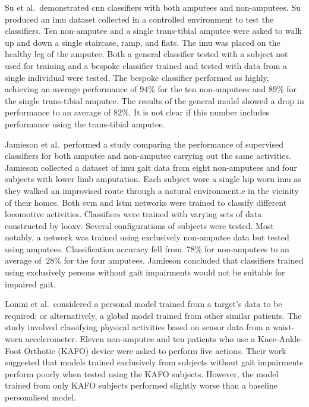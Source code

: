 Su et al.~demonstrated \acrshort{cnn} classifiers with both amputees and non-amputees. Su produced an \acrshort{imu} dataset collected in a controlled environment to test the classifiers. Ten non-amputee and a single trans-tibial amputee were asked to walk up and down a single staircase, ramp, and flats. The \acrshort{imu} was placed on the healthy leg of the amputee. Both a general classifier tested with a subject not used for training and a bespoke classifier trained and tested with data from a single individual were tested. The bespoke classifier performed as highly, achieving an average performance of $94\%$ for the ten non-amputees and $89\%$ for the single trans-tibial amputee. The results of the general model showed a drop in performance to an average of $82\%$. It is not clear if this number includes performance using the trans-tibial amputee.\cite{Su2019}

Jamieson et al.~performed a study comparing the performance of supervised classifiers for both amputee and non-amputee carrying out the same activities. Jamieson collected a dataset of \acrshort{imu} gait data from eight non-amputees and four subjects with lower limb amputation. Each subject wore a single hip worn \acrshort{imu} as they walked an improvised route through a natural environment.e in the vicinity of their homes.  Both \acrfull{svm} and \acrshort{lstm} networks were trained to classify different locomotive activities. Classifiers were trained with varying sets of data constructed by \acrfull{looxv}. Several configurations of subjects were tested. Most notably, a network was trained using exclusively non-amputee data but tested using amputees. Classification accuracy fell from $~78\%$ for non-amputees to an average of $~28\%$ for the four amputees. Jamieson concluded that classifiers trained using exclusively persons without gait impairments would not be suitable for impaired gait.\cite{Jamieson2021}

Lonini et al.~considered a personal model trained from a target's data to be required; or alternatively, a global model trained from other similar patients. The study involved classifying physical activities based on sensor data from a waist-worn accelerometer. Eleven non-amputee and ten patients who use a Knee-Ankle-Foot Orthotic (KAFO) device were asked to perform five actions. Their work suggested that models trained exclusively from subjects without gait impairments perform poorly when tested using the KAFO subjects. However, the model trained from only KAFO subjects performed slightly worse than a baseline personalised model.\cite{Lonini2016}

